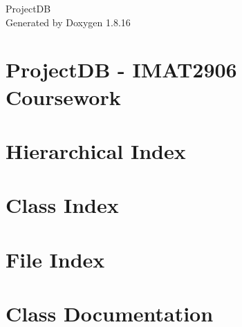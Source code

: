 \let\mypdfximage\pdfximage\def\pdfximage{\immediate\mypdfximage}\documentclass[twoside]{book}
\newcommand{\+}{\discretionary{\mbox{\scriptsize$\hookleftarrow$}}{}{}}
\newcommand{\clearemptydoublepage}{%
  \newpage{\pagestyle{empty}\cleardoublepage}%
}
\begin{document}
\hypersetup{pageanchor=false,
             bookmarksnumbered=true,
             pdfencoding=unicode
            }
\begin{titlepage}
\vspace*{7cm}
\begin{center}%
{\Large Project\+DB }\\
\vspace*{1cm}
{\large Generated by Doxygen 1.8.16}\\
\end{center}
\end{titlepage}
\clearemptydoublepage
{}
\tableofcontents
\clearemptydoublepage
{}
\hypersetup{pageanchor=true}

\chapter{Project\+DB -\/ I\+M\+A\+T2906 Coursework}
\label{index}\hypertarget{index}{}
\chapter{Hierarchical Index}

\chapter{Class Index}

\chapter{File Index}

\chapter{Class Documentation}


































\end{document}
